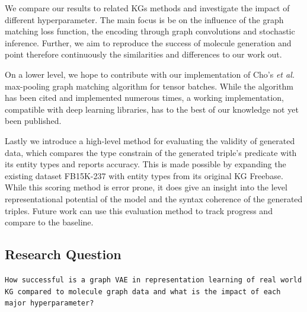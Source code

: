We compare our results to related KGs methods and investigate the impact of different hyperparameter. The main focus is be on the influence of the graph matching loss function, the encoding through graph convolutions and stochastic inference. Further, we aim to reproduce the success of molecule generation and point therefore continuously the similarities and differences to our work out.

On a lower level, we hope to contribute with our implementation of Cho's \textit{et al.} max-pooling graph matching algorithm for tensor batches. While the algorithm has been cited and implemented numerous times, a working implementation, compatible with deep learning libraries, has to the best of our knowledge not yet been published.  

Lastly we introduce a high-level method for evaluating the validity of generated data, which compares the type constrain of the generated triple's predicate with its entity types and reports accuracy. This is made possible by expanding the existing dataset FB15K-237 with entity types from its original KG Freebase. While this scoring method is error prone, it does give an insight into the level representational potential of the model and the syntax coherence of the generated triples. Future work can use this evaluation method to track progress and compare to the baseline. 



\subsection{Research Question}

\begin{center}
    \texttt{How successful is a graph VAE in representation learning of real world KG compared to molecule graph data and what is the impact of each major hyperparameter?}
    \label{sec1:requestion}
\end{center}


